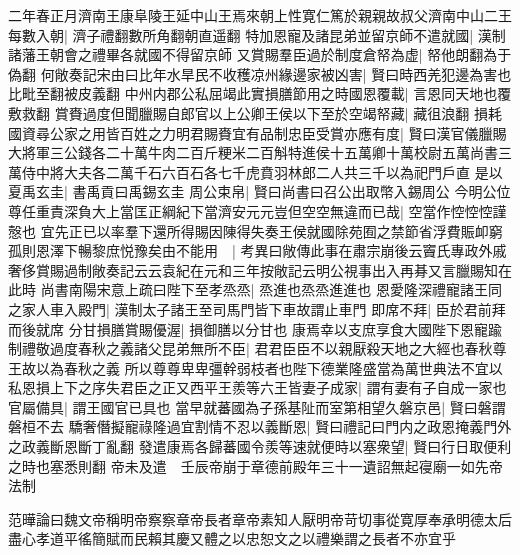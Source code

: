 二年春正月濟南王康阜陵王延中山王焉來朝上性寛仁篤於親親故叔父濟南中山二王每數入朝|{
	濟子禮翻數所角翻朝直遥翻}
特加恩寵及諸昆弟並留京師不遣就國|{
	漢制諸藩王朝會之禮畢各就國不得留京師}
又賞賜羣臣過於制度倉帑為虚|{
	帑他朗翻為于偽翻}
何敞奏記宋由曰比年水旱民不收穫凉州緣邊家被凶害|{
	賢曰時西羌犯邊為害也比毗至翻被皮義翻}
中州内郡公私屈竭此實損膳節用之時國恩覆載|{
	言恩同天地也覆敷救翻}
賞賚過度但聞臘賜自郎官以上公卿王侯以下至於空竭帑藏|{
	藏徂浪翻}
損耗國資尋公家之用皆百姓之力明君賜賚宜有品制忠臣受賞亦應有度|{
	賢曰漢官儀臘賜大將軍三公錢各二十萬牛肉二百斤粳米二百斛特進侯十五萬卿十萬校尉五萬尚書三萬侍中將大夫各二萬千石六百石各七千虎賁羽林郎二人共三千以為祀門戶直}
是以夏禹玄圭|{
	書禹貢曰禹錫玄圭}
周公束帛|{
	賢曰尚書曰召公出取幣入錫周公}
今明公位尊任重責深負大上當匡正綱紀下當濟安元元豈但空空無違而已哉|{
	空當作悾悾悾謹慤也}
宜先正已以率羣下還所得賜因陳得失奏王侯就國除苑囿之禁節省浮費賑卹窮孤則恩澤下暢黎庶悦豫矣由不能用　|{
	考異曰敞傳此事在肅宗崩後云竇氏專政外戚奢侈賞賜過制敞奏記云云袁紀在元和三年按敞記云明公視事出入再朞又言臘賜知在此時}
尚書南陽宋意上疏曰陛下至孝烝烝|{
	烝進也烝烝進進也}
恩愛隆深禮寵諸王同之家人車入殿門|{
	漢制太子諸王至司馬門皆下車故謂止車門}
即席不拜|{
	臣於君前拜而後就席}
分甘損膳賞賜優渥|{
	損御膳以分甘也}
康焉幸以支庶享食大國陛下恩寵踰制禮敬過度春秋之義諸父昆弟無所不臣|{
	君君臣臣不以親厭殺天地之大經也春秋尊王故以為春秋之義}
所以尊尊卑卑彊幹弱枝者也陛下德業隆盛當為萬世典法不宜以私恩損上下之序失君臣之正又西平王羨等六王皆妻子成家|{
	謂有妻有子自成一家也}
官屬備具|{
	謂王國官已具也}
當早就蕃國為子孫基阯而室第相望久磐京邑|{
	賢曰磐謂磐桓不去}
驕奢僭擬寵祿隆過宜割情不忍以義斷恩|{
	賢曰禮記曰門内之政恩掩義門外之政義斷恩斷丁亂翻}
發遣康焉各歸蕃國令羨等速就便時以塞衆望|{
	賢曰行日取便利之時也塞悉則翻}
帝未及遣　壬辰帝崩于章德前殿年三十一遺詔無起寑廟一如先帝法制

范曄論曰魏文帝稱明帝察察章帝長者章帝素知人厭明帝苛切事從寛厚奉承明德太后盡心孝道平徭簡賦而民賴其慶又體之以忠恕文之以禮樂謂之長者不亦宜乎

